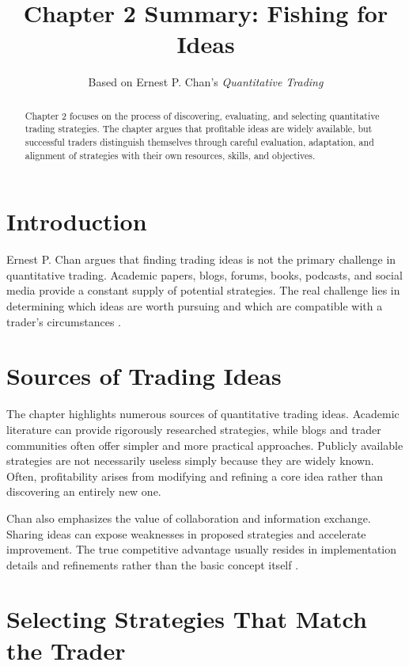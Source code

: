 \documentclass[11pt]{article}
\title{Chapter 2 Summary: Fishing for Ideas}
\author{Based on Ernest P. Chan's \textit{Quantitative Trading}}
\date{}
\begin{document}
\maketitle

\begin{abstract}
Chapter 2 focuses on the process of discovering, evaluating, and selecting quantitative trading strategies. The chapter argues that profitable ideas are widely available, but successful traders distinguish themselves through careful evaluation, adaptation, and alignment of strategies with their own resources, skills, and objectives.
\end{abstract}

\section{Introduction}

Ernest P. Chan argues that finding trading ideas is not the primary challenge in quantitative trading. Academic papers, blogs, forums, books, podcasts, and social media provide a constant supply of potential strategies. The real challenge lies in determining which ideas are worth pursuing and which are compatible with a trader's circumstances \cite{chan2021}.

\section{Sources of Trading Ideas}

The chapter highlights numerous sources of quantitative trading ideas. Academic literature can provide rigorously researched strategies, while blogs and trader communities often offer simpler and more practical approaches. Publicly available strategies are not necessarily useless simply because they are widely known. Often, profitability arises from modifying and refining a core idea rather than discovering an entirely new one.

Chan also emphasizes the value of collaboration and information exchange. Sharing ideas can expose weaknesses in proposed strategies and accelerate improvement. The true competitive advantage usually resides in implementation details and refinements rather than the basic concept itself \cite{chan2021}.

\section{Selecting Strategies That Match the Trader}
\end{document}
